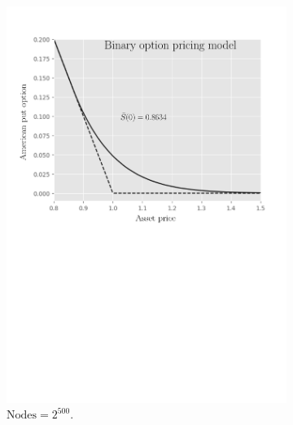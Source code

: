\begin{figure}[tbp]
  \centering
  \begin{subfigure}{0.4\textwidth}
    \centering
    \includegraphics[width=\textwidth]{chapters/chapter5/TestCase2LcpBOPM.pdf}
    \caption{$\text{Nodes} = 2^{500}$.}
    \label{fig:lcp:numericaresults:test_case_2_bopm}
  \end{subfigure}
  \hspace{0.5cm}
  \begin{subfigure}{0.4\textwidth}
    \centering

\end{subfigure}
\end{figure}
